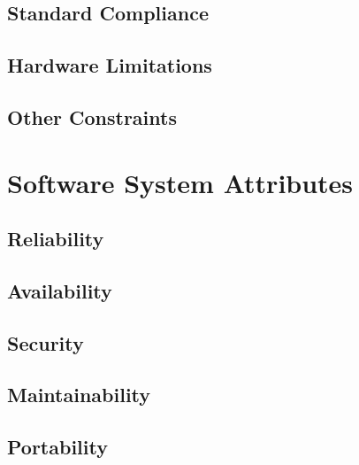 \subsection{Standard Compliance}
\subsection{Hardware Limitations}
\subsection{Other Constraints}

\newpage
\section{Software System Attributes}
\subsection{Reliability}
\subsection{Availability}
\subsection{Security}
\subsection{Maintainability}
\subsection{Portability}